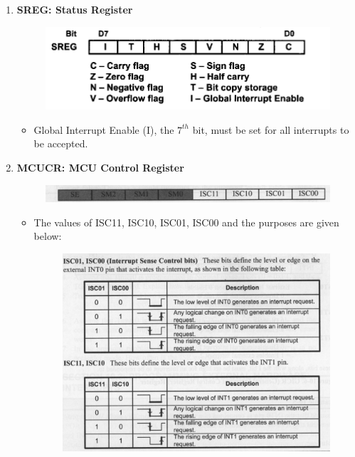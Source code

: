 \documentclass[titlepage, 11pt]{article}
\begin{document}
\begin{enumerate}
    \item \textbf{SREG: Status Register}
    \begin{figure}[H]
        \centering
        \includegraphics[width=0.75\linewidth]{SREG.png}
    \end{figure}
        \begin{itemize}
            \item Global Interrupt Enable (I), the $7^{th}$ bit, must be set for all interrupts to be accepted.
        \end{itemize}
    
    
    \item \textbf{MCUCR: MCU Control Register}
    \begin{figure}[H]
        \centering
        \includegraphics[width=1\linewidth]{MCUCR.png}  
    \end{figure}

        \begin{itemize}
            \item The values of ISC11, ISC10, ISC01, ISC00 and the purposes are given below:
            \begin{figure}[H]
                \centering
                \includegraphics[width=0.8\linewidth]{INT0_and_INT1.png}
            \end{figure}
        \end{itemize}
    

\end{enumerate}
\end{document}
